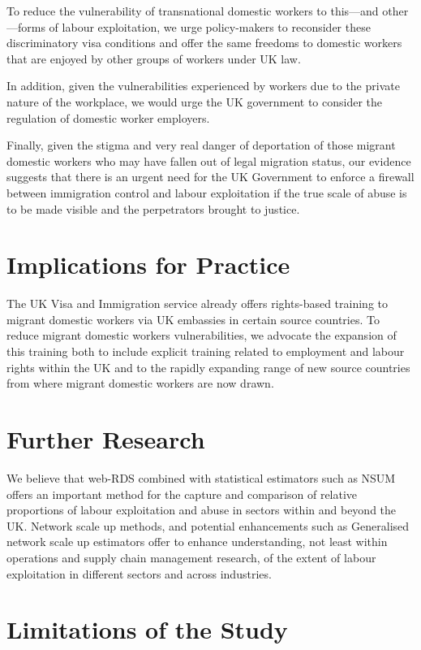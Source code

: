 \documentclass[
  12pt,
  letterpaper,
  DIV=11,
  numbers=noendperiod]{scrartcl}
\theoremstyle{plain}
\theoremstyle{definition}
\begin{document}
To reduce the vulnerability of transnational domestic workers to
this---and other---forms of labour exploitation, we urge policy-makers
to reconsider these discriminatory visa conditions and offer the same
freedoms to domestic workers that are enjoyed by other groups of workers
under UK law.

In addition, given the vulnerabilities experienced by workers due to the
private nature of the workplace, we would urge the UK government to
consider the regulation of domestic worker employers.

Finally, given the stigma and very real danger of deportation of those
migrant domestic workers who may have fallen out of legal migration
status, our evidence suggests that there is an urgent need for the UK
Government to enforce a firewall between immigration control and labour
exploitation if the true scale of abuse is to be made visible and the
perpetrators brought to justice.

\section{Implications for Practice}\label{implications-for-practice}

The UK Visa and Immigration service already offers rights-based training
to migrant domestic workers via UK embassies in certain source
countries. To reduce migrant domestic workers vulnerabilities, we
advocate the expansion of this training both to include explicit
training related to employment and labour rights within the UK and to
the rapidly expanding range of new source countries from where migrant
domestic workers are now drawn.

\section{Further Research}\label{further-research}

We believe that web-RDS combined with statistical estimators such as
NSUM offers an important method for the capture and comparison of
relative proportions of labour exploitation and abuse in sectors within
and beyond the UK. Network scale up methods, and potential enhancements
such as Generalised network scale up estimators offer to enhance
understanding, not least within operations and supply chain management
research, of the extent of labour exploitation in different sectors and
across industries.

\section{Limitations of the Study}\label{limitations-of-the-study}
\end{document}

